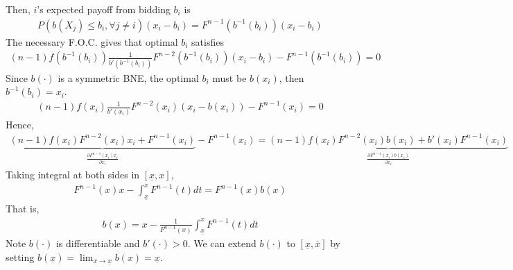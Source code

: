 \documentclass[11pt]{elegantbook}
\begin{document}
Then, $i$'s expected payoff from bidding $b_i$ is
\begin{equation}
    \begin{aligned}
        P(b(X_j)\leq b_i,\forall j\neq i)(x_i-b_i)=F^{n-1}(b^{-1}(b_i))(x_i-b_i)
    \end{aligned}
    \nonumber
\end{equation}
The necessary F.O.C. gives that optimal $b_i$ satisfies
\begin{equation}
    \begin{aligned}
        (n-1)f(b^{-1}(b_i))\frac{1}{b'(b^{-1}(b_i))}F^{n-2}(b^{-1}(b_i))(x_i-b_i)-F^{n-1}(b^{-1}(b_i))=0
    \end{aligned}
    \nonumber
\end{equation}
Since $b(\cdot)$ is a symmetric BNE, the optimal $b_i$ must be $b(x_i)$, then $b^{-1}(b_i)=x_i$.
\begin{equation}
    \begin{aligned}
        (n-1)f(x_i)\frac{1}{b'(x_i)}F^{n-2}(x_i)(x_i-b(x_i))-F^{n-1}(x_i)=0
    \end{aligned}
    \nonumber
\end{equation}
Hence,
\begin{equation}
    \begin{aligned}
        \underbrace{(n-1)f(x_i)F^{n-2}(x_i)x_i+F^{n-1}(x_i)}_{\frac{\partial F^{n-1}(x_i)x_i}{\partial x_i}}-F^{n-1}(x_i)=\underbrace{(n-1)f(x_i)F^{n-2}(x_i)b(x_i)+b'(x_i)F^{n-1}(x_i)}_{\frac{\partial F^{n-1}(x_i)b(x_i)}{\partial x_i}}
    \end{aligned}
    \nonumber
\end{equation}
Taking integral at both sides in $[\underline{x},x]$,
\begin{equation}
    \begin{aligned}
        F^{n-1}(x)x-\int_{\underline{x}}^x F^{n-1}(t) dt= F^{n-1}(x)b(x)
    \end{aligned}
    \nonumber
\end{equation}
That is,
\begin{equation}
    \begin{aligned}
        b(x)=x-\frac{1}{F^{n-1}(x)}\int_{\underline{x}}^x F^{n-1}(t) dt
    \end{aligned}
    \label{FPA:symmetric BNE}
\end{equation}
Note $b(\cdot)$ is differentiable and $b'(\cdot)>0$. We can extend $b(\cdot)$ to $[\underline{x},\overline{x}]$ by setting $b(\underline{x})=\lim_{x \rightarrow \underline{x}} b(x)=\underline{x}$.
\end{document}
